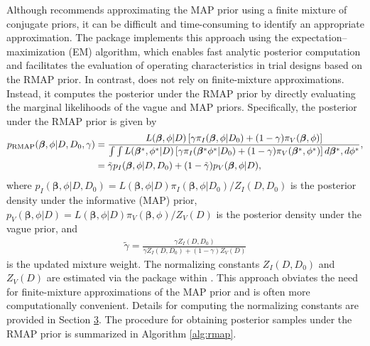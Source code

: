 Although \cite{schmidli2014robust} recommends approximating the MAP prior using a finite mixture of conjugate priors, it can be difficult and time-consuming to identify an appropriate approximation. The  package implements this approach using the expectation–maximization (EM) algorithm, which enables fast analytic posterior computation and facilitates the evaluation of operating characteristics in trial designs based on the RMAP prior. In contrast,  does not rely on finite-mixture approximations. Instead, it computes the posterior under the RMAP prior by directly evaluating the marginal likelihoods of the vague and MAP priors. Specifically, the posterior under the RMAP prior is given by
\begin{align}
    p_{\text{RMAP}}(\bm{\beta}, \phi | D, D_0, \gamma) &= 
    \frac{
    L(\bm{\beta}, \phi | D) \left[ \gamma \pi_I(\bm{\beta}, \phi | D_0) + (1 - \gamma) \pi_V(\bm{\beta}, \phi) \right]
    }{
        \int \int
        L(\bm{\beta}^*, \phi^* | D) \left[ \gamma \pi_I( \bm{\beta}^* \phi^* | D_0) + (1 - \gamma) \pi_V( \bm{\beta}^*, \phi^* ) \right] 
        d\bm{\beta}^*, d\phi^*
    }
    ,
    \notag \\
    &= \tilde{\gamma} p_I(\bm{\beta}, \phi | D, D_0) + (1 - \tilde{\gamma}) p_V(\bm{\beta}, \phi | D),
\end{align}
where $p_I(\bm{\beta}, \phi | D, D_0) = L(\bm{\beta}, \phi | D) \pi_I(\bm{\beta}, \phi | D_0) / Z_I(D, D_0)$ is the posterior density under the informative (MAP) prior, $p_V(\bm{\beta}, \phi | D) = L(\bm{\beta}, \phi | D) \pi_V(\bm{\beta}, \phi) / Z_V(D)$ is the posterior density under the vague prior, and
\begin{align}
    \tilde{\gamma} = \frac{ \gamma Z_I(D, D_0) }{ \gamma Z_I(D, D_0) + (1 - \gamma) Z_V(D) }
    \label{eq:rmap_weight}
\end{align}
is the updated mixture weight. The normalizing constants $Z_I(D, D_0)$ and $Z_V(D)$ are estimated via the  package within . This approach obviates the need for finite-mixture approximations of the MAP prior and is often more computationally convenient. Details for computing the normalizing constants are provided in Section \hyperref[sec:normconst]{3}. The procedure for obtaining posterior samples under the RMAP prior is summarized in Algorithm \ref{alg:rmap}.

